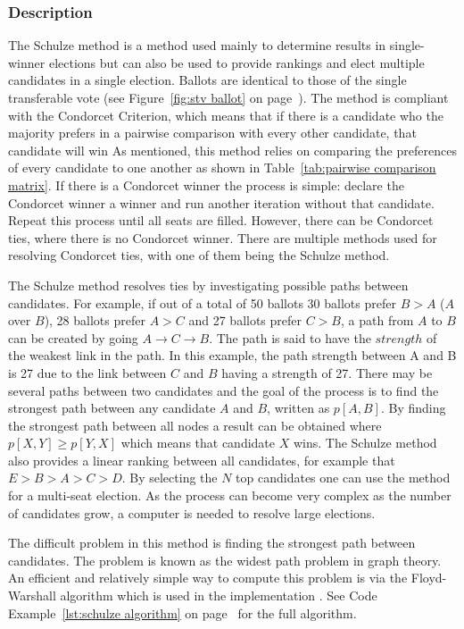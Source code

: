 \documentclass[12pt]{article}
\begin{document}
\subsubsection{Description}
The Schulze method is a method used mainly to determine results in single-winner elections but can also be used to provide rankings and elect multiple candidates in a single election. Ballots are identical to those of the single transferable vote (see Figure~\ref{fig:stv ballot} on page~\pageref{fig:stv ballot}). The method is compliant with the Condorcet Criterion, which means that if there is a candidate who the majority prefers in a pairwise comparison with every other candidate, that candidate will win  As mentioned, this method relies on comparing the preferences of every candidate to one another as shown in Table~\ref{tab:pairwise comparison matrix}. If there is a Condorcet winner the process is simple: declare the Condorcet winner a winner and run another iteration without that candidate. Repeat this process until all seats are filled. However, there can be Condorcet ties, where there is no Condorcet winner. There are multiple methods used for resolving Condorcet ties, with one of them being the Schulze method. \autocite{johnson2005}

The Schulze method resolves ties by investigating possible paths between candidates. For example, if out of a total of 50 ballots 30 ballots prefer $B>A$ ($A$ over $B$), 28 ballots prefer $A>C$ and 27 ballots prefer $C>B$, a path from $A$ to $B$ can be created by going $A \rightarrow C \rightarrow B$. The path is said to have the $strength$ of the weakest link in the path. In this example, the path strength between A and B is 27 due to the link between $C$ and $B$ having a strength of 27. There may be several paths between two candidates and the goal of the process is to find the strongest path between any candidate $A$ and $B$, written as $p[A,B]$. By finding the strongest path between all nodes a result can be obtained where $p[X,Y] \geq p[Y,X]$ which means that candidate $X$ wins. The Schulze method also provides a linear ranking between all candidates, for example that $E > B > A > C > D$. By selecting the $N$ top candidates one can use the method for a multi-seat election. As the process can become very complex as the number of candidates grow, a computer is needed to resolve large elections. \autocite{Schulze2011}

The difficult problem in this method is finding the strongest path between candidates. The problem is known as the widest path problem in graph theory. An efficient and relatively simple way to compute this problem is via the Floyd-Warshall algorithm which is used in the implementation \autocite{wikipedia2017warshall}. See Code Example~\ref{lst:schulze algorithm} on page~\pageref{lst:schulze algorithm} for the full algorithm.
\end{document}

